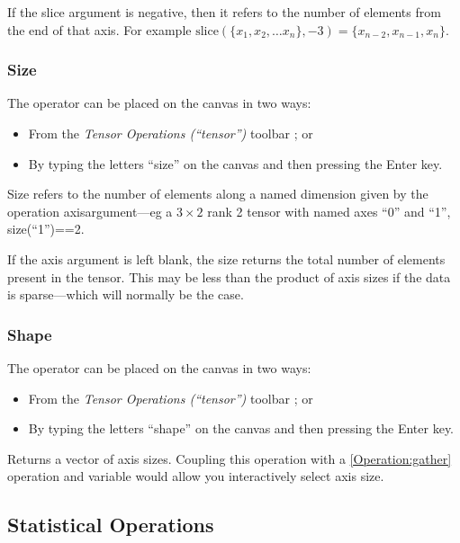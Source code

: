 If the slice argument is negative, then it refers to the number of
elements from the end of that axis. For example $\mathrm{slice}(\{x_{1},x_{2},\ldots x_{n}\},-3)=\{x_{n-2},x_{n-1},x_{n}\}$.

\subsubsection{Size}

\label{Operation:size}


The operator can be placed on the canvas in two ways:
\begin{itemize}
\item From the \emph{Tensor Operations (``tensor'')} toolbar ;
or 
\item By typing the letters ``size'' on the canvas and then pressing the
Enter key.
\end{itemize}
Size refers to the number of elements along a named dimension given
by the operation axisargument---eg a $3\times2$ rank 2 tensor with
named axes ``0'' and ``1'', size(``1'')==2.

If the axis argument is left blank, the size returns the total number
of elements present in the tensor. This may be less than the product
of axis sizes if the data is sparse---which will normally be the
case.

\subsubsection{Shape}

\label{Operation:shape}


The operator can be placed on the canvas in two ways:
\begin{itemize}
\item From the \emph{Tensor Operations (``tensor'')} toolbar ;
or 
\item By typing the letters ``shape'' on the canvas and then pressing the
Enter key.
\end{itemize}
Returns a vector of axis sizes. Coupling this operation with a \ref{Operation:gather}
operation and variable would allow you interactively select axis size.

\subsection{Statistical Operations}

